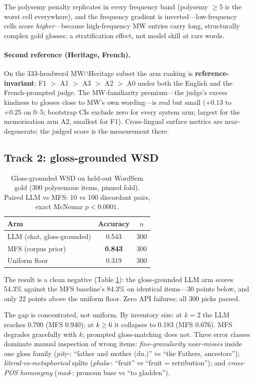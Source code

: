 \documentclass[11pt]{article}
\begin{document}
The polysemy penalty replicates in every frequency band (polysemy $\geq$5 is the worst
cell everywhere), and the frequency gradient is inverted---low-frequency cells score
\emph{higher}---because high-frequency MW entries carry long, structurally complex gold
glosses: a stratification effect, not model skill at rare words.

\paragraph{Second reference (Heritage, French).} On the 333-headword MW$\cap$Heritage
subset the arm ranking is \textbf{reference-invariant}: F1 $>$ A1 $>$ A3 $>$ A2 $>$ A0
under both the English and the French-prompted judge. The MW-familiarity premium---the
judge's excess kindness to glosses close to MW's own wording---is real but small
($+0.13$ to $+0.25$ on 0--5; bootstrap CIs exclude zero for every system arm; largest
for the memorisation arm A2, smallest for F1). Cross-lingual surface metrics are
near-degenerate; the judged score is the measurement there.

\subsection{Track 2: gloss-grounded WSD}

\begin{table}[h]
\centering
\small
\begin{tabular}{lcc}
\hline
Arm & Accuracy & $n$ \\
\hline
LLM (chat, gloss-grounded) & 0.543 & 300 \\
MFS (corpus prior) & \textbf{0.843} & 300 \\
Uniform floor & 0.319 & 300 \\
\hline
\end{tabular}
\caption{Gloss-grounded WSD on held-out WordSem gold (300 polysemous items, pinned
fold). Paired LLM vs MFS: 10 vs 100 discordant pairs, exact McNemar $p<0.0001$.}
\label{tab:wsd}
\end{table}

The result is a clean negative (Table \ref{tab:wsd}): the gloss-grounded LLM arm scores
54.3\% against the MFS baseline's 84.3\% on identical items---30 points below, and only
22 points above the uniform floor. Zero API failures; all 300 picks parsed.

The gap is concentrated, not uniform. By inventory size: at $k=2$ the LLM reaches 0.700
(MFS 0.940); at $k\geq6$ it collapses to 0.183 (MFS 0.676). MFS degrades gracefully
with $k$; prompted gloss-matching does not. Three error classes dominate manual
inspection of wrong items: \emph{fine-granularity near-misses} inside one gloss family
(\emph{pit\d{r}}-: ``father and mother (du.)'' vs ``the Fathers, ancestors'');
\emph{literal-vs-metaphorical} splits (\emph{phala}-: ``fruit'' vs ``fruit =
retribution''); and \emph{cross-POS homonymy} (\emph{mad}-: pronoun base vs ``to
gladden'').
\end{document}
